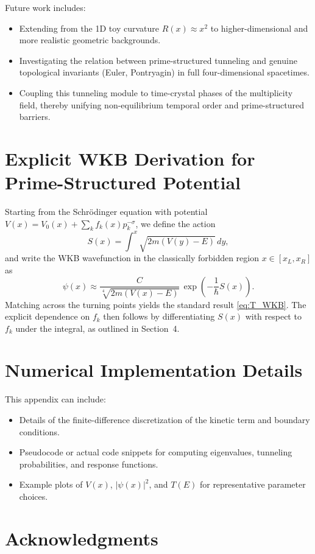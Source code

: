 \documentclass[11pt]{article}
\begin{document}
Future work includes:
\begin{itemize}
  \item Extending from the 1D toy curvature \(R(x)\approx x^2\) to
  higher-dimensional and more realistic geometric backgrounds.
  \item Investigating the relation between prime-structured tunneling
  and genuine topological invariants (Euler, Pontryagin) in full
  four-dimensional spacetimes.
  \item Coupling this tunneling module to time-crystal phases of the
  multiplicity field, thereby unifying non-equilibrium temporal order
  and prime-structured barriers.
\end{itemize}

\appendix

\section{Explicit WKB Derivation for Prime-Structured Potential}
\label{app:wkb}

Starting from the Schr\"odinger equation with potential
\(V(x)=V_0(x)+\sum_k f_k(x)p_k^{-\sigma}\), we define the action
\begin{equation}
  S(x) = \int^x \sqrt{2m\left(V(y)-E\right)}\,dy,
\end{equation}
and write the WKB wavefunction in the classically forbidden region
\(x\in[x_L,x_R]\) as
\begin{equation}
  \psi(x) \approx \frac{C}{\sqrt[4]{2m\left(V(x)-E\right)}}\,
  \exp\left(-\frac{1}{\hbar}S(x)\right).
\end{equation}
Matching across the turning points yields the standard result
\eqref{eq:T_WKB}. The explicit dependence on \(f_k\) then follows by
differentiating \(S(x)\) with respect to \(f_k\) under the integral, as
outlined in Section~4.

\section{Numerical Implementation Details}
\label{app:numerics}

This appendix can include:
\begin{itemize}
  \item Details of the finite-difference discretization of the kinetic
  term and boundary conditions.
  \item Pseudocode or actual code snippets for computing eigenvalues,
  tunneling probabilities, and response functions.
  \item Example plots of \(V(x)\), \(|\psi(x)|^2\), and
  \(T(E)\) for representative parameter choices.
\end{itemize}

\section*{Acknowledgments}



\nocite{*}

 
\end{document}
